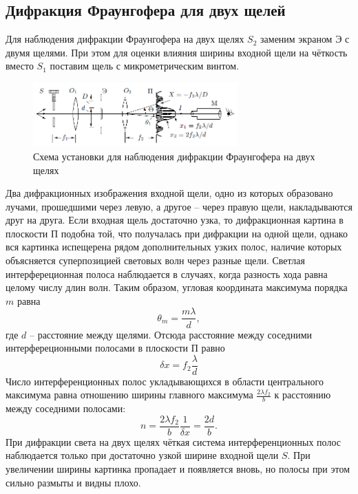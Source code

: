 \documentclass[a4paper, 12pt]{article}
\begin{document}
	\subsection{Дифракция Фраунгофера для двух щелей}
	Для наблюдения дифракции Фраунгофера на двух щелях $S_2$ заменим экраном Э с двумя щелями. При этом для оценки влияния ширины входной щели на чёткость вместо $S_1$ поставим щель с микрометрическим винтом.
	\begin{figure}[h]
		\includegraphics[width = 0.7\textwidth]{431-5.png}
		\centering
		\caption{Схема установки для наблюдения дифракции Фраунгофера на двух щелях}
		\label{Две щели схема}
	\end{figure}
	Два дифракционных изображения входной щели, одно из которых образовано лучами, прошедшими через левую, а другое -- через правую щели, накладываются друг на друга.
	Если входная щель достаточно узка, то дифракционная картина в плоскости П подобна той, что получалась при дифракции на одной щели, однако вся картинка испещерена рядом дополнительных узких полос, наличие которых объясняется суперпозицией световых волн через разные щели. Светлая интерфереционная полоса наблюдается в случаях, когда разность хода равна целому числу длин волн. Таким образом, угловая координата максимума порядка $m$ равна
	\begin{equation}
	\theta_m = \dfrac{m \lambda}{d},
	\end{equation}
	где $d$ -- расстояние между щелями. Отсюда расстояние между соседними интерфереционными полосами в плоскости П равно
	\begin{equation}
	\delta x = f_2 \dfrac{\lambda}{d}
	\label{Расстояние две щели}
	\end{equation}
	Число интерференционных полос укладывающихся в области центрального максимума равна отношению ширины главного максимума $\frac{2\lambda f_2}{b}$ к расстоянию между соседними полосами:
	\begin{equation}
	n = \dfrac{2\lambda f_2}{b} \dfrac{1}{\delta x}= \dfrac{2d}{b}.
	\label{Число полос две щели}
	\end{equation}
	При дифракции света на двух щелях чёткая система интерференционных полос наблюдается только при достаточно узкой ширине входной щели $S$. При увеличении ширины картинка пропадает и появляется вновь, но полосы при этом сильно размыты и видны плохо.
\end{document}
